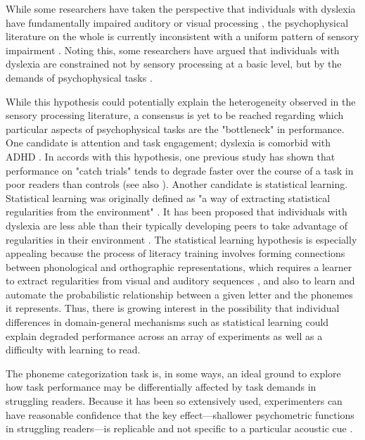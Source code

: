 \documentclass[../uwthesis.tex]{subfiles}
\begin{document}
While some researchers have taken the perspective that individuals with dyslexia have fundamentally impaired auditory or visual processing \citep{Stein2018TheDyslexia,Stein2018TheDyslexia,Goswami2011,Tallal1996}, the psychophysical literature on the whole is currently inconsistent with a uniform pattern of sensory impairment \citep{Hamalainen2013,Amitay2002,Stuart2006,Rosen2003}. Noting this, some researchers have argued that individuals with dyslexia are constrained not by sensory processing at a basic level, but by the demands of psychophysical tasks \citep{Ramus2012,Ahissar2007}. 

While this hypothesis could potentially explain the heterogeneity observed in the sensory processing literature, a consensus is yet to be reached regarding which particular aspects of psychophysical tasks are the "bottleneck" in performance. One candidate is attention and task engagement; dyslexia is comorbid with ADHD \citep{Light1995,Stevenson2005,Germano2010}. In accords with this hypothesis, one previous study has shown that performance on "catch trials" tends to degrade faster over the course of a task in poor readers than controls \citep{Messaoud-Galusi2011} (see also \citep{Roach2004TheDyslexia}). Another candidate is statistical learning. Statistical learning was originally defined as "a way of extracting statistical regularities from the environment" \citep{Saffran1996StatisticalInfants}. It has been proposed that individuals with dyslexia are less able than their typically developing peers to take advantage of regularities in their environment \citep{Banai2006,Ahissar2006,Lieder2019PerceptualDyslexia,Gabay2015}. The statistical learning hypothesis is especially appealing because the process of literacy training involves forming connections between phonological and orthographic representations, which requires a learner to extract regularities from visual and auditory sequences \citep{Ziegler2005ReadingTheory}, and also to learn and automate the probabilistic relationship between a given letter and the phonemes it represents. Thus, there is growing interest in the possibility that individual differences in domain-general mechanisms such as statistical learning could explain degraded performance across an array of experiments as well as a difficulty with learning to read.

The phoneme categorization task is, in some ways, an ideal ground to explore how task performance may be differentially affected by task demands in struggling readers. Because it has been so extensively used, experimenters can have reasonable confidence that the key effect---shallower psychometric functions in struggling readers---is replicable and not specific to a particular acoustic cue \citep{Noordenbos2015,OBrien2018,OBrien2019CategoricalDuration}.
\end{document}
